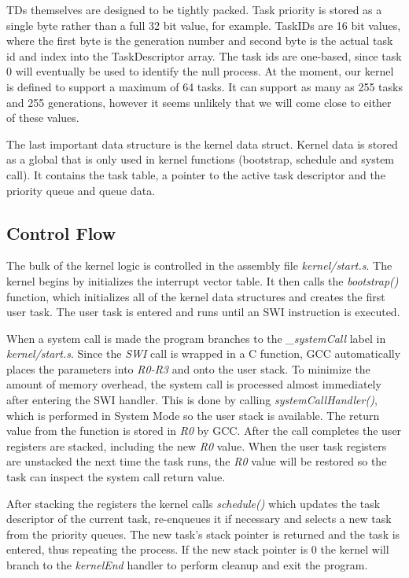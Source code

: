 \documentclass[twoside,a4paper]{refart}
\begin{document}
TDs themselves are designed to be tightly packed. Task priority is stored as a single byte rather than a full 32 bit value, for example. TaskIDs are 16 bit values, where the first byte is the generation number and second byte is the actual task id and index into the TaskDescriptor array. The task ids are one-based, since task 0 will eventually be used to identify the null process. At the moment, our kernel is defined to support a maximum of 64 tasks. It can support as many as 255 tasks and 255 generations, however it seems unlikely that we will come close to either of these values.

The last important data structure is the kernel data struct. Kernel data is stored as a global that is only used in  kernel functions (bootstrap, schedule and system call). It contains the task table, a pointer to the active task descriptor and the priority queue and queue data.

\subsection{Control Flow}
The bulk of the kernel logic is controlled in the assembly file \textit{kernel/start.s}. The kernel begins by initializes the interrupt vector table. It then calls the \textit{bootstrap()} function, which initializes all of the kernel data structures and creates the first user task. The user task is entered and runs until an SWI instruction is executed.

When a system call is made the program branches to the \textit{\_systemCall} label in \textit{kernel/start.s}. Since the \textit{SWI} call is wrapped in a C function, GCC automatically places the parameters into \textit{R0-R3} and onto the user stack. To minimize the amount of memory overhead, the system call is processed almost immediately after entering the SWI handler. This is done by calling \textit{systemCallHandler()}, which is performed in System Mode so the user stack is available. The return value from the function is stored in \textit{R0} by GCC. After the call completes the user registers are stacked, including the new \textit{R0} value. When the user task registers are unstacked the next time the task runs, the \textit{R0} value will be restored so the task can inspect the system call return value.

After stacking the registers the kernel calls \textit{schedule()} which updates the task descriptor of the current task, re-enqueues it if necessary and selects a new task from the priority queues. The new task’s stack pointer is returned and the task is entered, thus repeating the process. If the new stack pointer is 0 the kernel will branch to the \textit{kernelEnd} handler to perform cleanup and exit the program.
\end{document}
